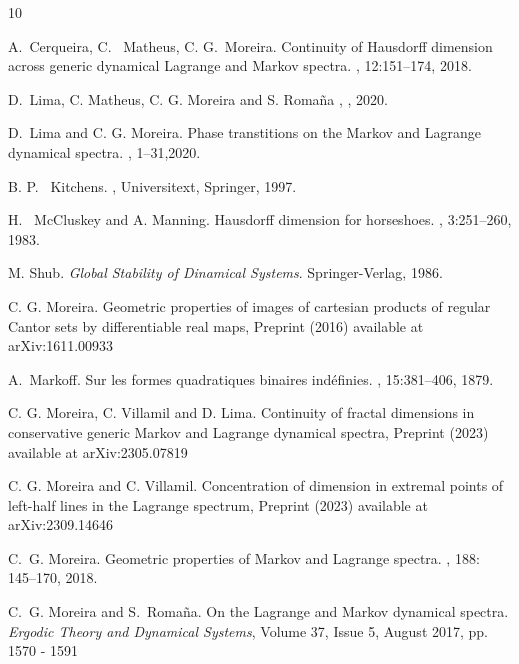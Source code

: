 \documentclass[12pt]{amsart}
\theoremstyle{plain} %
\theoremstyle{definition} %
\numberwithin{equation}{section}
\begin{document}
\begin{thebibliography}{10}

A.~Cerqueira, C. ~Matheus, C. G.~Moreira.
\newblock Continuity of Hausdorff dimension across generic dynamical Lagrange
  and Markov spectra.
, 12:151--174, 2018.
 
D.~Lima, C. Matheus, C. G. Moreira and S. Roma\~na 
,
, 2020.

D.~Lima and C. G. Moreira.
\newblock  Phase transtitions on the Markov and Lagrange dynamical spectra.
, 1--31,2020.

B. P. ~Kitchens.
,
\newblock Universitext, Springer, 1997.

H. ~McCluskey and A. Manning.
\newblock Hausdorff dimension for horseshoes.
, 3:251--260, 1983.

 M. Shub. \emph{Global Stability of Dinamical Systems}. Springer-Verlag, 1986.

C. G. Moreira.
\newblock Geometric properties of images of cartesian products of regular Cantor
sets by differentiable real maps,
\newblock Preprint (2016) available at arXiv:1611.00933

A.~Markoff.
\newblock Sur les formes quadratiques binaires ind\'efinies.
, 15:381--406, 1879.

C. G. Moreira, C. Villamil and D. Lima.
\newblock Continuity of fractal dimensions in conservative generic Markov and Lagrange dynamical spectra,
\newblock Preprint (2023) available at arXiv:2305.07819

C. G. Moreira and C. Villamil.
\newblock Concentration of dimension in extremal points of left-half lines in the Lagrange spectrum,
\newblock Preprint (2023) available at arXiv:2309.14646

C.~G. Moreira.
\newblock Geometric properties of Markov and Lagrange spectra.
, 188: 145--170, 2018.

C.~G. Moreira and S.~Roma\~na.
\newblock On the Lagrange and Markov dynamical spectra.
\emph{Ergodic Theory and Dynamical Systems}, Volume 37, Issue 5, August 2017, pp. 1570 - 1591


\end{thebibliography}
\end{document}

